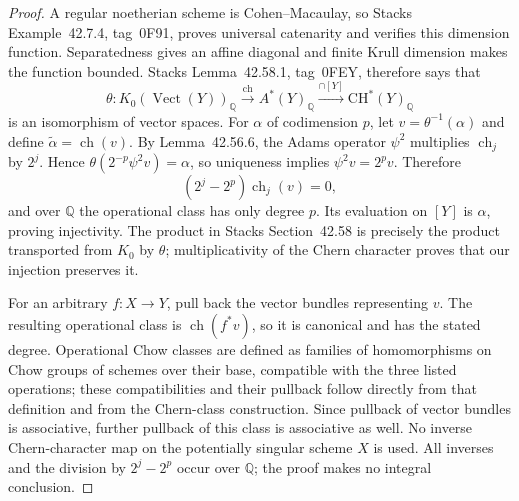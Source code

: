 \begin{proof}
A regular noetherian scheme is Cohen--Macaulay, so Stacks Example~42.7.4, tag~0F91, proves universal catenarity and verifies this dimension function. Separatedness gives an affine diagonal and finite Krull dimension makes the function bounded. Stacks Lemma~42.58.1, tag~0FEY, therefore says that
\[
 \theta:K_0(\operatorname{Vect}(Y))_{\mathbb Q}
 \xrightarrow{\operatorname{ch}}A^*(Y)_{\mathbb Q}
 \xrightarrow{\cap[Y]}\mathrm{CH}^*(Y)_{\mathbb Q}
\]
is an isomorphism of vector spaces. For $\alpha$ of codimension $p$, let $v=\theta^{-1}(\alpha)$ and define $\widetilde\alpha=\operatorname{ch}(v)$. By Lemma~42.56.6, the Adams operator $\psi^2$ multiplies $\operatorname{ch}_j$ by $2^j$. Hence $\theta(2^{-p}\psi^2v)=\alpha$, so uniqueness implies $\psi^2v=2^pv$. Therefore
\[
 (2^j-2^p)\operatorname{ch}_j(v)=0,
\]
and over $\mathbb Q$ the operational class has only degree $p$. Its evaluation on $[Y]$ is $\alpha$, proving injectivity. The product in Stacks Section~42.58 is precisely the product transported from $K_0$ by $\theta$; multiplicativity of the Chern character proves that our injection preserves it.

For an arbitrary $f:X\to Y$, pull back the vector bundles representing $v$. The resulting operational class is $\operatorname{ch}(f^*v)$, so it is canonical and has the stated degree. Operational Chow classes are defined as families of homomorphisms on Chow groups of schemes over their base, compatible with the three listed operations; these compatibilities and their pullback follow directly from that definition and from the Chern-class construction. Since pullback of vector bundles is associative, further pullback of this class is associative as well. No inverse Chern-character map on the potentially singular scheme $X$ is used. All inverses and the division by $2^j-2^p$ occur over $\mathbb Q$; the proof makes no integral conclusion.
\end{proof}

